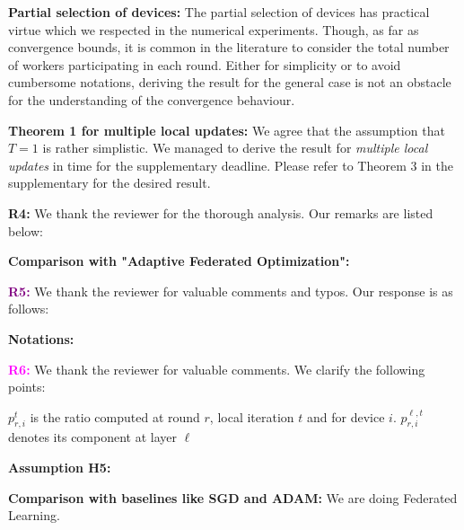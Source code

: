 \documentclass{article}
\begin{document}
\textbf{Partial selection of devices:} The partial selection of devices has practical virtue which we respected in the numerical experiments.
Though, as far as convergence bounds, it is common in the literature to consider the total number of workers participating in each round.
Either for simplicity or to avoid cumbersome notations, deriving the result for the general case is not an obstacle for the understanding of the convergence behaviour.

\textbf{Theorem 1 for multiple local updates:} 
We agree that the assumption that $T =1$ is rather simplistic.
We managed to derive the result for \emph{multiple local updates} in time for the supplementary deadline.
Please refer to Theorem 3 in the supplementary for the desired result.
 
\textbf{\textcolor{green!50!black}{R4:}} We thank the reviewer for the thorough analysis. Our remarks are listed below: 

\textbf{Comparison with "Adaptive Federated Optimization":} 
 

\textbf{\textcolor{purple}{R5:}} We thank the reviewer for valuable comments and typos. Our response is as follows: 


\textbf{Notations:} 

 

\textbf{\textcolor{magenta}{R6:}} We thank the reviewer for valuable comments. We clarify the following points: 

$p_{r,i}^{t}$ is the ratio computed at round $r$, local iteration $t$ and for device $i$. $p_{r,i}^{\ell,t}$ denotes its component at layer $\ell$


\textbf{Assumption H5:} 

\textbf{Comparison with baselines like SGD and ADAM:}  We are doing Federated Learning.
\end{document}
